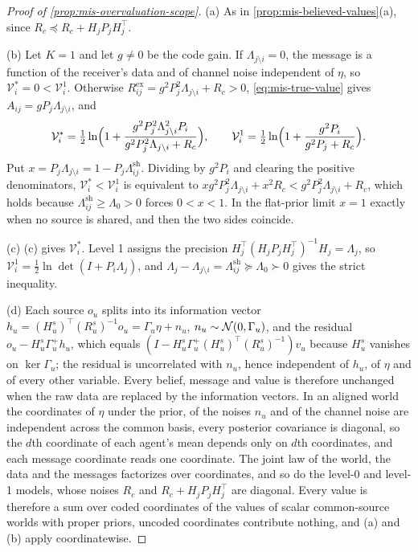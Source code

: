 \begin{proof}[Proof of \cref{prop:mis-overvaluation-scope}]
(a) As in \cref{prop:mis-believed-values}(a), since $R_c\preceq R_c+H_jP_jH_j^\top$.

(b) Let $K=1$ and let $g\neq0$ be the code gain. If $\Lambda_{j\setminus i}=0$, the message is a function of the receiver's data and of channel noise independent of $\eta$, so $\mathcal V^\ast_i=0<\mathcal V^1_i$. Otherwise $R^{\mathrm{ex}}_{ij}=g^2P_j^2\Lambda_{j\setminus i}+R_c>0$, \eqref{eq:mis-true-value} gives $A_{ij}=gP_j\Lambda_{j\setminus i}$, and
\begin{equation*}
\mathcal V^\ast_i=\tfrac12\ln\Bigl(1+\frac{g^2P_j^2\Lambda_{j\setminus i}^2P_i}{g^2P_j^2\Lambda_{j\setminus i}+R_c}\Bigr),\qquad\mathcal V^1_i=\tfrac12\ln\Bigl(1+\frac{g^2P_i}{g^2P_j+R_c}\Bigr).
\end{equation*}
Put $x=P_j\Lambda_{j\setminus i}=1-P_j\Lambda^{\mathrm{sh}}_{ij}$. Dividing by $g^2P_i$ and clearing the positive denominators, $\mathcal V^\ast_i<\mathcal V^1_i$ is equivalent to $xg^2P_j^2\Lambda_{j\setminus i}+x^2R_c<g^2P_j^2\Lambda_{j\setminus i}+R_c$, which holds because $\Lambda^{\mathrm{sh}}_{ij}\ge\Lambda_0>0$ forces $0<x<1$. In the flat-prior limit $x=1$ exactly when no source is shared, and then the two sides coincide.

(c) (c) gives $\mathcal V^\ast_i$. Level 1 assigns the precision $H_j^\top(H_jP_jH_j^\top)^{-1}H_j=\Lambda_j$, so $\mathcal V^1_i=\tfrac12\ln\det(I+P_i\Lambda_j)$, and $\Lambda_j-\Lambda_{j\setminus i}=\Lambda^{\mathrm{sh}}_{ij}\succeq\Lambda_0\succ0$ gives the strict inequality.

(d) Each source $o_u$ splits into its information vector $h_u=(H^s_u)^\top(R^s_u)^{-1}o_u=\Gamma_u\eta+n_u$, $n_u\sim\mathcal{N}(0,\Gamma_u)$, and the residual $o_u-H^s_u\Gamma_u^+h_u$, which equals $(I-H^s_u\Gamma_u^+(H^s_u)^\top(R^s_u)^{-1})v_u$ because $H^s_u$ vanishes on $\ker\Gamma_u$; the residual is uncorrelated with $n_u$, hence independent of $h_u$, of $\eta$ and of every other variable. Every belief, message and value is therefore unchanged when the raw data are replaced by the information vectors. In an aligned world the coordinates of $\eta$ under the prior, of the noises $n_u$ and of the channel noise are independent across the common basis, every posterior covariance is diagonal, so the $d$th coordinate of each agent's mean depends only on $d$th coordinates, and each message coordinate reads one coordinate. The joint law of the world, the data and the messages factorizes over coordinates, and so do the level-0 and level-1 models, whose noises $R_c$ and $R_c+H_jP_jH_j^\top$ are diagonal. Every value is therefore a sum over coded coordinates of the values of scalar common-source worlds with proper priors, uncoded coordinates contribute nothing, and (a) and (b) apply coordinatewise.


\end{proof}
